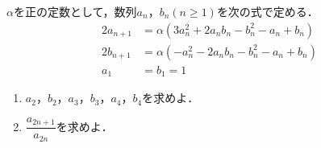 \documentclass[../../main.tex]{subfiles}
\begin{document}
$\alpha$を正の定数として，数列$a_n$，$b_n (n\ge 1)$を次の式で定める．
\begin{align*}
  2a_{n+1} & =\alpha\left(3a_n^2+2a_nb_n-b_n^2-a_n+b_n\right) \\
  2b_{n+1} & =\alpha\left(-a_n^2-2a_nb_n-b_n^2-a_n+b_n\right) \\
  a_1      & =b_1=1
\end{align*}
\begin{enumerate}
  \item $a_2$，$b_2$，$a_3$，$b_3$，$a_4$，$b_4$を求めよ．
  \item $\dfrac{a_{2n+1}}{a_{2n}}$を求めよ．
\end{enumerate}
\end{document}
